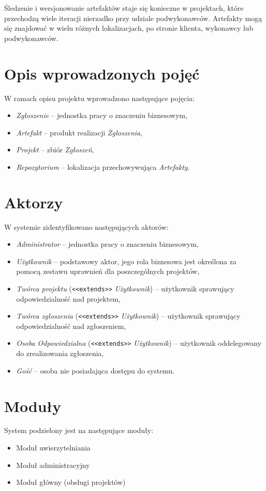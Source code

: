 \documentclass[12pt, oneside, final]{report}
\begin{document}
Śledzenie i wersjonowanie artefaktów staje się konieczne w projektach, które przechodzą wiele iteracji nierzadko przy udziale podwykonawców. Artefakty mogą się znajdować w wielu różnych lokalizacjach, po stronie klienta, wykonawcy lub podwykonawców.

\section{Opis wprowadzonych pojęć}
W ramach opisu projektu wprowadzono następujące pojęcia:
\begin{itemize}
	\item \textit{Zgłoszenie} -- jednostka pracy o znaczeniu biznesowym,
	\item \textit{Artefakt} -- produkt realizacji \textit{Zgłoszenia},
	\item \textit{Projekt} -- zbiór \textit{Zgłoszeń},
	\item \textit{Repozytorium} -- lokalizacja przechowywująca \textit{Artefakty}.
\end{itemize}

\section{Aktorzy}
W systemie zidentyfikowano następujących aktorów:
\begin{itemize}
	\item \textit{Administrator} -- jednostka pracy o znaczeniu biznesowym,
	\item \textit{Użytkownik} -- podstawowy aktor, jego rola biznesowa jest określona za pomocą zestawu uprawnień dla poszczególnych projektów,
	\item \textit{Twórca projektu} (\texttt{<<extends>>} \textit{Użytkownik}) -- użytkownik sprawujący odpowiedzialność nad projektem,
	\item \textit{Twórca zgłoszenia} (\texttt{<<extends>>} \textit{Użytkownik}) -- użytkownik sprawujący odpowiedzialność nad zgłoszeniem,
	\item \textit{Osoba Odpowiedzialna} (\texttt{<<extends>>} \textit{Użytkownik}) -- użytkownik oddelegowany do zrealizowania zgłoszenia,
	\item \textit{Gość} -- osoba nie posiadająca dostępu do systemu.
\end{itemize}

\section{Moduły}
System podzielony jest na następujące moduły:
\begin{itemize}
	\item Moduł uwierzytelniania
	\item Moduł administracyjny
	\item Moduł główny (obsługi projektów)	
\end{itemize}
\end{document}
